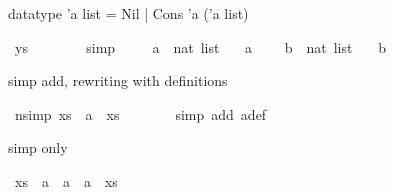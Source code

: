 \begin{isabellebody}
\begin{isamarkuptext}
datatype 'a list = Nil | Cons 'a ('a list)%
\end{isamarkuptext}\isamarkuptrue%
\isamarkupfalse%
\isanewline
\isanewline
{}\isamarkupfalse%
\ {\isachardoublequoteopen}ys\ {\isacharat}{\kern0pt}\ {\isacharbrackleft}{\kern0pt}{\isacharbrackright}{\kern0pt}\ {\isacharequal}{\kern0pt}\ {\isacharbrackleft}{\kern0pt}{\isacharbrackright}{\kern0pt}{\isachardoublequoteclose}\isanewline
%
\isadelimproof
\ \ %
\endisadelimproof
%
\isatagproof
{}\isamarkupfalse%
\ simp\isanewline
\ \ \isamarkupfalse%
%
\endisatagproof
{\isafoldproof}%
%
\isadelimproof
\isanewline
%
\endisadelimproof
\isanewline
{}\isamarkupfalse%
\isanewline
\ \ a\ {\isacharcolon}{\kern0pt}{\isacharcolon}{\kern0pt}\ {\isachardoublequoteopen}nat\ list{\isachardoublequoteclose}\ \isanewline
\ \ {\isachardoublequoteopen}a\ {\isasymequiv}\ {\isacharbrackleft}{\kern0pt}{\isacharbrackright}{\kern0pt}{\isachardoublequoteclose}\isanewline
\isanewline
{}\isamarkupfalse%
\isanewline
\ \ b\ {\isacharcolon}{\kern0pt}{\isacharcolon}{\kern0pt}\ {\isachardoublequoteopen}nat\ list{\isachardoublequoteclose}\ \isanewline
\ \ {\isachardoublequoteopen}b\ {\isasymequiv}\ {\isacharbrackleft}{\kern0pt}{\isacharbrackright}{\kern0pt}{\isachardoublequoteclose}%
\begin{isamarkuptext}%
simp add, rewriting with definitions%
\end{isamarkuptext}\isamarkuptrue%
\isamarkupfalse%
\ n{\isacharbrackleft}{\kern0pt}simp{\isacharbrackright}{\kern0pt}{\isacharcolon}{\kern0pt}\ {\isachardoublequoteopen}xs\ {\isacharat}{\kern0pt}\ a\ {\isacharequal}{\kern0pt}\ xs{\isachardoublequoteclose}\ \isanewline
\ \ \isanewline
%
\isadelimproof
\ \ %
\endisadelimproof
%
\isatagproof
{}\isamarkupfalse%
\ {\isacharparenleft}{\kern0pt}simp\ add{\isacharcolon}{\kern0pt}\ a{\isacharunderscore}{\kern0pt}def{\isacharparenright}{\kern0pt}\isanewline
\ \ \isamarkupfalse%
%
\endisatagproof
{\isafoldproof}%
%
\isadelimproof
%
\endisadelimproof
%
\begin{isamarkuptext}%
simp only%
\end{isamarkuptext}\isamarkuptrue%
\isamarkupfalse%
\ {\isachardoublequoteopen}xs\ {\isacharat}{\kern0pt}\ a\ {\isacharat}{\kern0pt}\ a\ {\isacharat}{\kern0pt}\ a\ {\isacharequal}{\kern0pt}\ xs{\isachardoublequoteclose}\isanewline
\ \ \isamarkupfalse%

\end{isabellebody}
